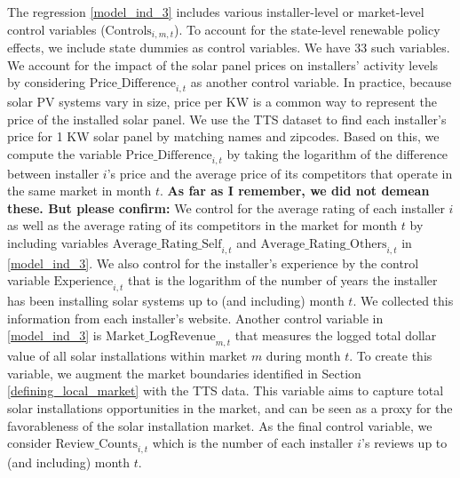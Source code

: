 \documentclass[msom,blindrev]{informs3}
\begin{document}
 The regression \eqref{model_ind_3} includes various installer-level or market-level control variables ($\text{Controls}_{i,m,t}$).  To account for the state-level renewable policy effects, we include state dummies as control variables. We have 33 such variables. We account for the impact of the solar panel prices on installers' activity levels by considering $\text{Price\_Difference}_{i,t}$ as another control variable.  In practice, because solar PV systems vary in size, price per KW is a common way to represent the price of the installed solar panel. We use the TTS dataset to find each installer's price for 1 KW solar panel by matching names and zipcodes. Based on this, we compute the variable $\text{Price\_Difference}_{i,t}$ by taking the logarithm of the difference between installer $i$'s price and the average price of its competitors that operate in the same market in month $t$. \textbf{As far as I remember, we did not demean these. But please confirm:} We control for the average rating of each installer $i$ as well as the average rating of its competitors in the market for month $t$ by including variables $\text{Average\_Rating\_Self}_{i,t}$ and $\text{Average\_Rating\_Others}_{i,t}$ in \eqref{model_ind_3}. We also control for the installer's experience by the control variable $\text{Experience}_{i,t}$ that is the logarithm of the number of years the installer has been installing solar systems up to (and including) month $t$. We collected this information from each installer's website. Another control variable in \eqref{model_ind_3} is $\text{Market\_LogRevenue}_{m,t}$  that measures the logged total dollar value of all solar installations within market $m$ during month $t$. To create this variable, we augment the market boundaries identified in Section \ref{defining_local_market} with the TTS data. This variable aims to capture total solar installations opportunities in the market, and can be seen as a proxy for the favorableness of the solar installation market. As the final control variable, we consider  $\text{Review\_Counts}_{i,t}$ which is the number of each installer $i$'s reviews up to (and including) month $t$.





%
\end{document}
